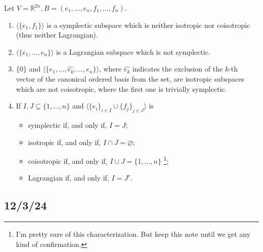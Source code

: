 \documentclass[misc]{subfiles}
\begin{document}
\begin{Exp}\label{Exp: Symplectic, isotropic, coisotropic and Lagrangian subspaces}
    Let $V=\mathbb{R}^{2n}, B=(e_1,\dots,e_n,f_1,\dots,f_n)$.

    \begin{enumerate}[label=\ExpLbl]

        \item $\langle \{e_1, f_1\} \rangle$ is a symplectic subspace which is neither isotropic nor coisotropic (thus neither Lagrangian).

        \item $\langle \{e_1,\dots,e_n\} \rangle$ is a Lagrangian subspace which is not symplectic.

        \item $\{0\}$ and $\langle \{e_1,\dots,\hat{e_k},\dots,e_n\} \rangle$, where $\hat{e_k}$ indicates the exclusion of the $k$-th vector of the canonical ordered basis from the set, are isotropic subspaces which are not coisotropic, where the first one is trivially symplectic.

        \item If $I,J\subseteq \{1,\dots,n\}$ and $\langle \{e_i\}_{i\in I}\cup\{f_j\}_{j\in J} \rangle$ is
            \begin{itemize}

                \item symplectic if, and only if, $I=J$;

                \item isotropic if, and only if, $I\cap J=\varnothing$;

                \item coisotropic if, and only if, $I \cup J = \{1,\dots,n\}$ \footnote{I'm pretty sure of this characterization. But keep this note until we get any kind of confirmation.};

                \item Lagrangian if, and only if, $I=J^c$.
            \end{itemize}
    \end{enumerate}
\end{Exp}

\subsection*{12/3/24}\label{Sec: 12/3/24}
\end{document}
